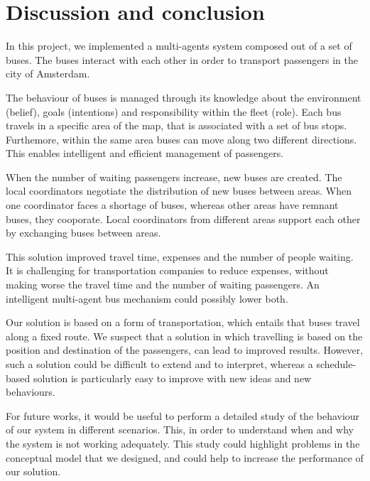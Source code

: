 \section{Discussion and conclusion}
In this project, we implemented a multi-agents system composed out of a set of buses. The buses interact with each other in order to transport passengers in the city of Amsterdam. 

The behaviour of buses is managed through its knowledge about the environment (belief), goals (intentions) and responsibility within the fleet (role). Each bus travels in a specific area of the map, that is associated with a set of bus stops. Furthemore, within the same area buses can move along two different directions. This enables intelligent and efficient management of passengers. 

When the number of waiting passengers increase, new buses are created. The local coordinators negotiate the distribution of new buses between areas. When one coordinator faces a shortage of buses, whereas other areas have remnant buses, they cooporate. Local coordinators from different areas support each other by exchanging buses between areas.

This solution improved travel time, expenses and the number of people waiting. It is challenging for transportation companies to reduce expenses, without making worse the travel time and the number of waiting passengers. An intelligent multi-agent bus mechanism could possibly lower both. 

Our solution is based on a form of transportation, which entails that buses travel along a fixed route. We suspect that a solution in which travelling is based on the position and destination of the passengers, can lead to improved results. However, such a solution could be difficult to extend and to interpret, whereas a schedule-based solution is particularly easy to improve with new ideas and new behaviours. 

For future works, it would be useful to perform a detailed study of the behaviour of our system in different scenarios. This, in order to understand when and why the system is not working adequately. This study could highlight problems in the conceptual model that we designed, and could help to increase the performance of our solution.
